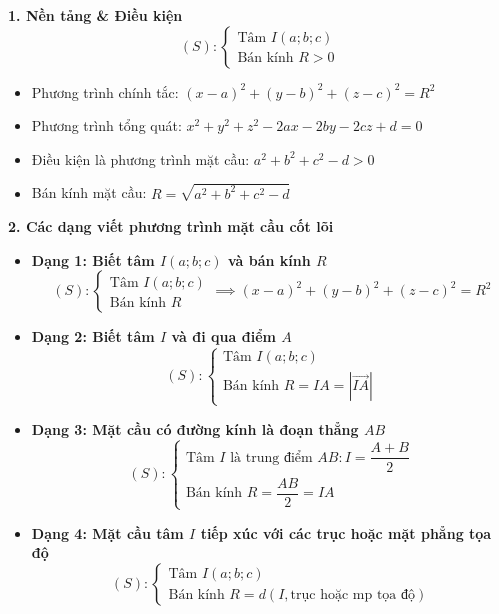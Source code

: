 \documentclass[12pt,a4paper]{article}
\begin{document}
\begin{theorybox}
    \textbf{\textcolor{deepblue}{\large 1. Nền tảng \& Điều kiện}}
    \[
        (S)\colon \begin{cases} 
            \text{Tâm } I(a; b; c) \\ 
            \text{Bán kính } R > 0 
        \end{cases}
    \]
    \begin{itemize}\setlength{\itemsep}{4pt}
        \item Phương trình chính tắc: $(x - a)^2 + (y - b)^2 + (z - c)^2 = R^2$
        \item Phương trình tổng quát: $x^2 + y^2 + z^2 - 2ax - 2by - 2cz + d = 0$
        \item Điều kiện là phương trình mặt cầu: $a^2 + b^2 + c^2 - d > 0$
        \item Bán kính mặt cầu: $R = \sqrt{a^2 + b^2 + c^2 - d}$
    \end{itemize}

    \vspace{0.2cm}
    \textbf{\textcolor{amberorange}{\large 2. Các dạng viết phương trình mặt cầu cốt lõi}}
    \begin{itemize}\setlength{\itemsep}{8pt}
        \item \textbf{Dạng 1: Biết tâm $I(a; b; c)$ và bán kính $R$}
        \[
            (S)\colon \begin{cases} \text{Tâm } I(a; b; c) \\ \text{Bán kính } R \end{cases} \implies (x - a)^2 + (y - b)^2 + (z - c)^2 = R^2
        \]

        \item \textbf{Dạng 2: Biết tâm $I$ và đi qua điểm $A$}
        \[
            (S)\colon \begin{cases} \text{Tâm } I(a; b; c) \\ \text{Bán kính } R = IA = |\vec{IA}| \end{cases}
        \]

        \item \textbf{Dạng 3: Mặt cầu có đường kính là đoạn thẳng $AB$}
        \[
            (S)\colon \begin{cases} \text{Tâm } I \text{ là trung điểm } AB\colon I = \dfrac{A + B}{2} \\[5pt] \text{Bán kính } R = \dfrac{AB}{2} = IA \end{cases}
        \]

        \item \textbf{Dạng 4: Mặt cầu tâm $I$ tiếp xúc với các trục hoặc mặt phẳng tọa độ}
        \[
            (S)\colon \begin{cases} \text{Tâm } I(a; b; c) \\ \text{Bán kính } R = d(I, \text{trục hoặc mp tọa độ}) \end{cases}
        \]


\end{itemize}
\end{theorybox}
\end{document}
